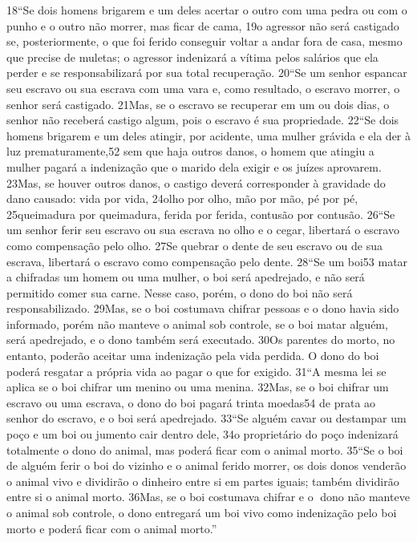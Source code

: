   18“Se dois homens brigarem e um deles acertar o outro com uma pedra ou com
o punho e o outro não morrer, mas ficar de cama, 19o agressor não será castigado
se, posteriormente, o que foi ferido conseguir voltar a andar fora de casa, mesmo
que precise de muletas; o agressor indenizará a vítima pelos salários que ela
perder e se responsabilizará por sua total recuperação.
   20“Se um senhor espancar seu escravo ou sua escrava com uma vara e, como
resultado, o escravo morrer, o senhor será castigado. 21Mas, se o escravo se
recuperar em um ou dois dias, o senhor não receberá castigo algum, pois o
escravo é sua propriedade.
   22“Se dois homens brigarem e um deles atingir, por acidente, uma mulher
grávida e ela der à luz prematuramente,52 sem que haja outros danos, o homem
que atingiu a mulher pagará a indenização que o marido dela exigir e os juízes
aprovarem. 23Mas, se houver outros danos, o castigo deverá corresponder à
gravidade do dano causado: vida por vida, 24olho por olho, mão por mão, pé por
pé, 25queimadura por queimadura, ferida por ferida, contusão por contusão.
   26“Se um senhor ferir seu escravo ou sua escrava no olho e o cegar, libertará o
escravo como compensação pelo olho. 27Se quebrar o dente de seu escravo ou de
sua escrava, libertará o escravo como compensação pelo dente.
   28“Se um boi53 matar a chifradas um homem ou uma mulher, o boi será
apedrejado, e não será permitido comer sua carne. Nesse caso, porém, o dono do
boi não será responsabilizado. 29Mas, se o boi costumava chifrar pessoas e o dono
havia sido informado, porém não manteve o animal sob controle, se o boi matar
alguém, será apedrejado, e o dono também será executado. 30Os parentes do
morto, no entanto, poderão aceitar uma indenização pela vida perdida. O dono do
boi poderá resgatar a própria vida ao pagar o que for exigido.
   31“A mesma lei se aplica se o boi chifrar um menino ou uma menina. 32Mas, se
o boi chifrar um escravo ou uma escrava, o dono do boi pagará trinta moedas54 de
prata ao senhor do escravo, e o boi será apedrejado.
   33“Se alguém cavar ou destampar um poço e um boi ou jumento cair dentro
dele, 34o proprietário do poço indenizará totalmente o dono do animal, mas
poderá ficar com o animal morto.
   35“Se o boi de alguém ferir o boi do vizinho e o animal ferido morrer, os dois
donos venderão o animal vivo e dividirão o dinheiro entre si em partes iguais;
também dividirão entre si o animal morto. 36Mas, se o boi costumava chifrar e o
dono não manteve o animal sob controle, o dono entregará um boi vivo como
indenização pelo boi morto e poderá ficar com o animal morto.”
